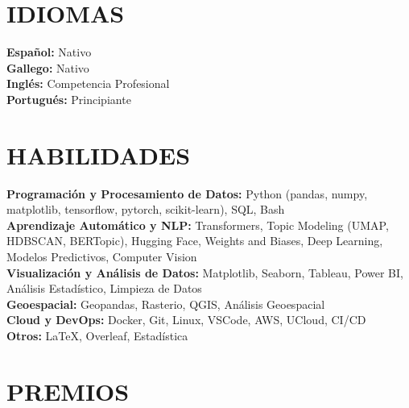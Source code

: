 \documentclass{resume}
\begin{document}
\section{IDIOMAS} 
\begin{content}
    {\bf Español:} Nativo \\ 
    {\bf Gallego:} Nativo \\ 
    {\bf Inglés:} Competencia Profesional \\ 
    {\bf Portugués:} Principiante \\
\end{content}

\section{HABILIDADES} 
\begin{content}
    {\bf Programación y Procesamiento de Datos:} Python {\footnotesize (pandas, numpy, matplotlib, tensorflow, pytorch, scikit-learn)}, SQL, Bash \\ 
    {\bf Aprendizaje Automático y NLP:} Transformers, Topic Modeling {\footnotesize (UMAP, HDBSCAN, BERTopic)}, Hugging Face, Weights and Biases, Deep Learning, Modelos Predictivos, Computer Vision \\ 
    {\bf Visualización y Análisis de Datos:} Matplotlib, Seaborn, Tableau, Power BI, Análisis Estadístico, Limpieza de Datos \\ 
    {\bf Geoespacial:} Geopandas, Rasterio, QGIS, Análisis Geoespacial \\ 
    {\bf Cloud y DevOps:} Docker, Git, Linux, VSCode, AWS, UCloud, CI/CD \\
    {\bf Otros:} \LaTeX, Overleaf, Estadística \\
\end{content}

\section{PREMIOS}
\begin{content}
     \\ 
     \\ 
\end{content}
\end{document}
